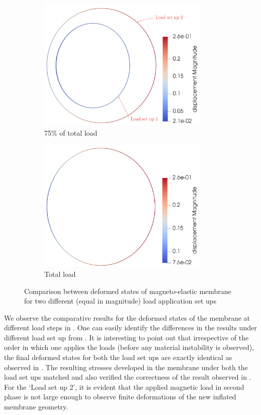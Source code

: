 \documentclass[11pt,a4paper,final]{article}
\begin{document}
\begin{figure}[h]
\begin{subfigure}{0.24\textwidth}
\includegraphics[width=0.9\textwidth]{torus_ls_75_mech_mag.pdf}
\caption{75\% of total load}
\label{fig:3.13.3}
\end{subfigure}
\begin{subfigure}{0.24\textwidth}
\centering
\includegraphics[width=0.9\textwidth]{torus_ls_100_mech_mag.png}
\caption{Total load}
\label{fig:3.13.4}
\end{subfigure}
\caption{Comparison between deformed states of magneto-elastic membrane for two different (equal in magnitude) load application set ups}
\label{fig:3.13}
\end{figure}

We observe the comparative results for the deformed states of the membrane at different load steps in . One can easily identify the differences in the results under different load set up from . It is interesting to point out that irrespective of the order in which one applies the loads (before any material instability is observed), the final deformed states for both the load set ups are exactly identical as observed in . The resulting stresses developed in the membrane under both the load set ups matched and also verified the correctness of the result observed in . For the `Load set up 2', it is evident that the applied magnetic load in second phase is not large enough to observe finite deformations of the new inflated membrane geometry. \par
\end{document}
